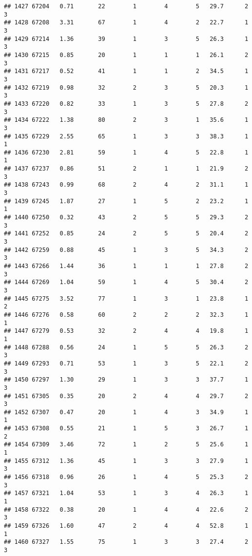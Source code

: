 \documentclass[
]{article}
\begin{document}
\begin{verbatim}
## 1427 67204   0.71       22        1        4        5   29.7      2      3
## 1428 67208   3.31       67        1        4        2   22.7      1      3
## 1429 67214   1.36       39        1        3        5   26.3      1      3
## 1430 67215   0.85       20        1        1        1   26.1      2      3
## 1431 67217   0.52       41        1        1        2   34.5      1      3
## 1432 67219   0.98       32        2        3        5   20.3      1      3
## 1433 67220   0.82       33        1        3        5   27.8      2      3
## 1434 67222   1.38       80        2        3        1   35.6      1      3
## 1435 67229   2.55       65        1        3        3   38.3      1      1
## 1436 67230   2.81       59        1        4        5   22.8      1      1
## 1437 67237   0.86       51        2        1        1   21.9      2      3
## 1438 67243   0.99       68        2        4        2   31.1      1      3
## 1439 67245   1.87       27        1        5        2   23.2      1      1
## 1440 67250   0.32       43        2        5        5   29.3      2      3
## 1441 67252   0.85       24        2        5        5   20.4      2      3
## 1442 67259   0.88       45        1        3        5   34.3      2      3
## 1443 67266   1.44       36        1        1        1   27.8      2      3
## 1444 67269   1.04       59        1        4        5   30.4      2      3
## 1445 67275   3.52       77        1        3        1   23.8      1      2
## 1446 67276   0.58       60        2        2        2   32.3      1      1
## 1447 67279   0.53       32        2        4        4   19.8      1      1
## 1448 67288   0.56       24        1        5        5   26.3      2      3
## 1449 67293   0.71       53        1        3        5   22.1      2      3
## 1450 67297   1.30       29        1        3        3   37.7      1      3
## 1451 67305   0.35       20        2        4        4   29.7      2      3
## 1452 67307   0.47       20        1        4        3   34.9      1      1
## 1453 67308   0.55       21        1        5        3   26.7      1      2
## 1454 67309   3.46       72        1        2        5   25.6      1      1
## 1455 67312   1.36       45        1        3        3   27.9      1      3
## 1456 67318   0.96       26        1        4        5   25.3      2      3
## 1457 67321   1.04       53        1        3        4   26.3      1      1
## 1458 67322   0.38       20        1        4        4   22.6      2      3
## 1459 67326   1.60       47        2        4        4   52.8      1      1
## 1460 67327   1.55       75        1        3        3   27.4      2      3

\end{verbatim}
\end{document}
